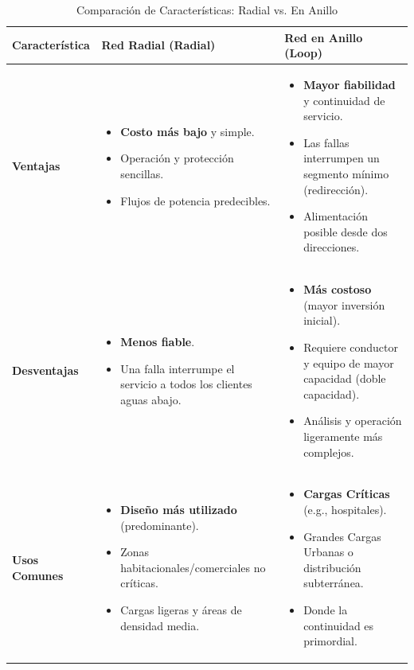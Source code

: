 \begin{table}[h!]
  \centering
  \caption{Comparación de Características: Radial vs. En Anillo}
  \label{tab:comparacion_redes_resumen}
  \begin{tabular}{p{} p{} p{}}
    \toprule
    \textbf{Característica} & \textbf{Red Radial (Radial)} & \textbf{Red en Anillo (Loop)} \\
    \midrule
    \textbf{Ventajas} &
    \begin{itemize}
      \item \textbf{Costo más bajo} y simple.
      \item Operación y protección sencillas.
      \item Flujos de potencia predecibles.
    \end{itemize} &
    \begin{itemize}
      \item \textbf{Mayor fiabilidad} y continuidad de servicio.
      \item Las fallas interrumpen un segmento mínimo (redirección).
      \item Alimentación posible desde dos direcciones.
    \end{itemize} \\
    \midrule
    \textbf{Desventajas} &
    \begin{itemize}
      \item \textbf{Menos fiable}.
      \item Una falla interrumpe el servicio a todos los clientes aguas abajo.
    \end{itemize} &
    \begin{itemize}
      \item \textbf{Más costoso} (mayor inversión inicial).
      \item Requiere conductor y equipo de mayor capacidad (doble capacidad).
      \item Análisis y operación ligeramente más complejos.
    \end{itemize} \\
    \midrule
    \textbf{Usos Comunes} &
    \begin{itemize}
      \item \textbf{Diseño más utilizado} (predominante).
      \item Zonas habitacionales/comerciales no críticas.
      \item Cargas ligeras y áreas de densidad media.
    \end{itemize} &
    \begin{itemize}
      \item \textbf{Cargas Críticas} (e.g., hospitales).
      \item Grandes Cargas Urbanas o distribución subterránea.
      \item Donde la continuidad es primordial.
    \end{itemize} \\
    \bottomrule
  \end{tabular}
\end{table}

